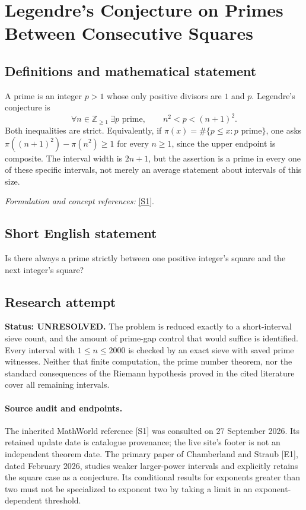 \documentclass[11pt]{article}
\begin{document}
\section*{\texorpdfstring{Legendre's Conjecture on Primes Between Consecutive Squares}{Legendre's Conjecture on Primes Between Consecutive Squares}}\label{321}
\subsection{Definitions and mathematical statement}
A prime is an integer $p>1$ whose only positive divisors are $1$ and $p$. Legendre's conjecture is
\[
 \forall n\in{\mathbb{Z}}_{\ge1}\ \exists p\text{ prime},
 \qquad n^2<p<(n+1)^2.
\]
Both inequalities are strict. Equivalently, if $\pi(x)=\#\{p\le x:p\text{ prime}\}$, one asks $\pi((n+1)^2)-\pi(n^2)\ge1$ for every $n\ge1$, since the upper endpoint is composite. The interval width is $2n+1$, but the assertion is a prime in every one of these specific intervals, not merely an average statement about intervals of this size.
\par\smallskip\textit{Formulation and concept references:} \href{https://mathworld.wolfram.com/LegendresConjecture.html}{[S1]}.

\subsection{Short English statement}
Is there always a prime strictly between one positive integer's square and the next integer's square?
\subsection{Research attempt}
\textbf{Status: UNRESOLVED.} The problem is reduced exactly to a short-interval sieve count, and the amount of prime-gap control that would suffice is identified. Every interval with $1\le n\le2000$ is checked by an exact sieve with saved prime witnesses. Neither that finite computation, the prime number theorem, nor the standard consequences of the Riemann hypothesis proved in the cited literature cover all remaining intervals.

\paragraph{Source audit and endpoints.}
The inherited MathWorld reference [S1] was consulted on 27 September 2026. Its retained update date is catalogue provenance; the live site's footer is not an independent theorem date. The primary paper of Chamberland and Straub [E1], dated February 2026, studies weaker larger-power intervals and explicitly retains the square case as a conjecture. Its conditional results for exponents greater than two must not be specialized to exponent two by taking a limit in an exponent-dependent threshold.
\end{document}
